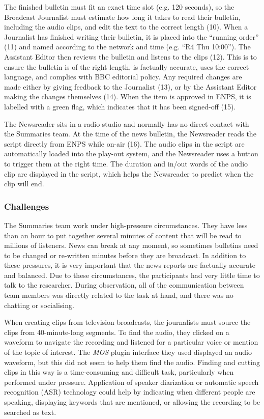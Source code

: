 The finished bulletin must fit an exact time slot (e.g. 120 seconds), so the Broadcast Journalist must estimate how
long it takes to read their bulletin, including the audio clips, and edit the text to the correct length (10).  When a
Journalist has finished writing their bulletin, it is placed into the ``running order'' (11) and named according to the
network and time (e.g. ``R4 Thu 10:00'').  The Assistant Editor then reviews the bulletin and listens to the clips (12). This
is to ensure the bulletin is of the right length, is factually accurate, uses the correct language, and complies with
BBC editorial policy. Any required changes are made either by giving feedback to the Journalist (13), or by the Assistant
Editor making the changes themselves (14).  When the item is approved in ENPS, it is labelled with a green flag, which
indicates that it has been signed-off (15).

The Newsreader sits in a radio studio and normally has no direct contact with the Summaries team.  At the time of the
news bulletin, the Newsreader reads the script directly from ENPS while on-air (16). The audio clips in the script are
automatically loaded into the play-out system, and the Newsreader uses a button to trigger them at the right time.  The
duration and in/out words of the audio clip are displayed in the script, which helps the Newsreader to predict when the
clip will end.

\subsubsection{Challenges}

The Summaries team work under high-pressure circumstances. They have less than an hour to put together several minutes
of content that will be read to millions of listeners. News can break at any moment, so sometimes bulletins need to be
changed or re-written minutes before they are broadcast. In addition to these pressures, it is very important that the
news reports are factually accurate and balanced.  Due to these circumstances, the participants had very little time to
talk to the researcher. During observation, all of the communication between team members was directly related to the
task at hand, and there was no chatting or socialising.

When creating clips from television broadcasts, the journalists must source the clips from 40-minute-long segments.  To
find the audio, they clicked on a waveform to navigate the recording and listened for a particular voice or mention of
the topic of interest.  The \textit{MOS} plugin interface they used displayed an audio waveform, but this did not seem
to help them find the audio.  Finding and cutting clips in this way is a time-consuming and difficult task,
particularly when performed under pressure.  Application of speaker diarization or automatic speech recognition (ASR)
technology could help by indicating when different people are speaking, displaying keywords that are mentioned, or
allowing the recording to be searched as text.

